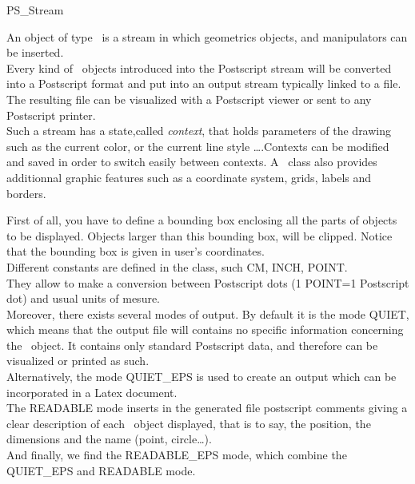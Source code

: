 \begin{ccClass} {PS\_Stream}

\ccDefinition 

An object of type \ccClassName\ is a stream in which geometrics
objects, and manipulators can be inserted.\\
Every kind of \cgal\ objects introduced into the Postscript stream will
be converted into a Postscript format and put into an output stream
typically linked to a file. The resulting file can be visualized with
a Postscript viewer or sent to any Postscript printer.\\
Such a stream has a state,called {\em context}, that
holds parameters of the drawing such as the current color, or the current line
style \ldots.Contexts can be modified and saved in order to
switch easily between contexts. A \ccClassName\ class also provides
additionnal graphic
features such as a coordinate system, grids, labels and borders.\\
\par
First of all, you have to define a bounding box enclosing all the
parts of objects to be displayed. Objects  
larger than this bounding box, will be clipped. Notice that the
bounding box is given in user's coordinates.\\

Different constants are defined in the \ccClassName\/  class, such CM, INCH,
POINT.\\
They allow to make a conversion between Postscript dots (1 POINT=1
Postscript dot) and usual units of mesure.\\

Moreover, there exists several modes of output. By default it is the mode
QUIET, which means that the output file will contains no specific information concerning
the \cgal\ object. It contains only standard  Postscript data, and
therefore can be visualized or printed as such.\\
Alternatively, the mode QUIET\_EPS is used to create an output which can be
incorporated in a Latex document.\\
The READABLE mode inserts in the generated file postscript comments
giving a clear description of 
each \cgal\ object displayed, that is to say, the position, the 
dimensions and the name (point, circle\ldots).\\
And finally, we find the READABLE\_EPS mode, which combine the QUIET\_EPS and
READABLE mode.\\



\end{ccClass}
